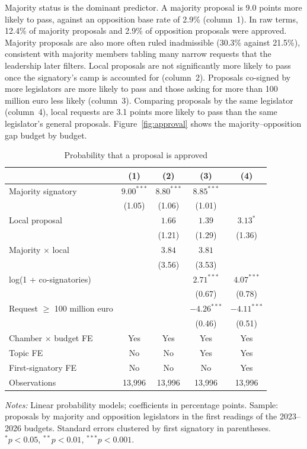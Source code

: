 \documentclass[12pt]{article}
\begin{document}
Majority status is the dominant predictor. A majority proposal is 9.0 points more likely to pass, against an opposition base rate of 2.9\% (column~1). In raw terms, 12.4\% of majority proposals and 2.9\% of opposition proposals were approved. Majority proposals are also more often ruled inadmissible (30.3\% against 21.5\%), consistent with majority members tabling many narrow requests that the leadership later filters. Local proposals are not significantly more likely to pass once the signatory's camp is accounted for (column~2). Proposals co-signed by more legislators are more likely to pass and those asking for more than 100 million euro less likely (column~3). Comparing proposals by the same legislator (column~4), local requests are 3.1 points more likely to pass than the same legislator's general proposals. Figure~\ref{fig:approval} shows the majority--opposition gap budget by budget.

\begin{table}[htbp]\centering\footnotesize\setlength{\tabcolsep}{4pt}
\begin{threeparttable}
\caption{Probability that a proposal is approved}\label{tab:approval}
\begin{tabular}{lcccc}
\toprule
 & (1) & (2) & (3) & (4) \\
\midrule
Majority signatory & $9.00^{***}$ & $8.80^{***}$ & $8.85^{***}$ &  \\
 & (1.05) & (1.06) & (1.01) &  \\
Local proposal & & $1.66$ & $1.39$ & $3.13^{*}$ \\
 & & (1.21) & (1.29) & (1.36) \\
Majority $\times$ local & & $3.84$ & $3.81$ &  \\
 & & (3.56) & (3.53) &  \\
log(1 + co-signatories) & & & $2.71^{***}$ & $4.07^{***}$ \\
 & & & (0.67) & (0.78) \\
Request $\geq$ 100 million euro & & & $-4.26^{***}$ & $-4.11^{***}$ \\
 & & & (0.46) & (0.51) \\[3pt]
Chamber $\times$ budget FE & Yes & Yes & Yes & Yes \\
Topic FE & No & No & Yes & Yes \\
First-signatory FE & No & No & No & Yes \\
Observations & 13,996 & 13,996 & 13,996 & 13,996 \\
\bottomrule
\end{tabular}
\begin{tablenotes}\footnotesize
\item \emph{Notes:} Linear probability models; coefficients in percentage points. Sample: proposals by majority and opposition legislators in the first readings of the 2023--2026 budgets. Standard errors clustered by first signatory in parentheses. $^{*}p<0.05$, $^{**}p<0.01$, $^{***}p<0.001$.
\end{tablenotes}
\end{threeparttable}
\end{table}
\end{document}
